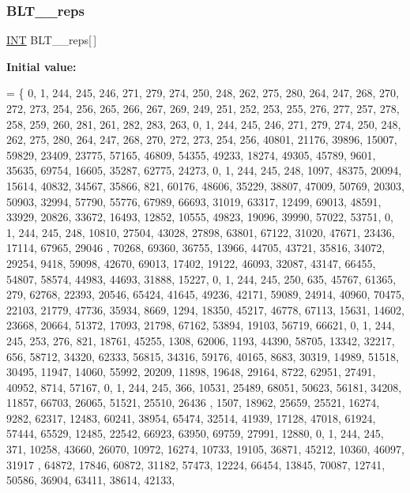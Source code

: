 \subsubsection{\texorpdfstring{B\+L\+T\+\_\+\_\+reps}{BLT\_41\_reps}}
{\footnotesize\ttfamily \mbox{\hyperlink{galois_8h_a09fddde158a3a20bd2dcadb609de11dc}{I\+NT}} B\+L\+T\+\_\+\_\+reps\mbox{[}$\,$\mbox{]}}

{\bfseries Initial value\+:}
\begin{DoxyCode}
= \{
    0, 1, 244, 245, 246, 271, 279, 274, 250, 248, 262, 275, 280, 264, 247, 268, 270, 272, 273, 254, 256, 
      265, 266, 267, 269, 249, 251, 252, 253, 255, 276, 277, 257, 278, 258, 259, 260, 281, 261, 282, 283, 263, 
    0, 1, 244, 245, 246, 271, 279, 274, 250, 248, 262, 275, 280, 264, 247, 268, 270, 272, 273, 254, 256, 
      40801, 21176, 39896, 15007, 59829, 23409, 23775, 57165, 46809, 54355, 49233, 18274, 49305, 45789, 9601, 35635,
       69754, 16605, 35287, 62775, 24273, 
    0, 1, 244, 245, 248, 1097, 48375, 20094, 15614, 40832, 34567, 35866, 821, 60176, 48606, 35229, 38807, 
      47009, 50769, 20303, 50903, 32994, 57790, 55776, 67989, 66693, 31019, 63317, 12499, 69013, 48591, 33929, 
      20826, 33672, 16493, 12852, 10555, 49823, 19096, 39990, 57022, 53751, 
    0, 1, 244, 245, 248, 10810, 27504, 43028, 27898, 63801, 67122, 31020, 47671, 23436, 17114, 67965, 29046
      , 70268, 69360, 36755, 13966, 44705, 43721, 35816, 34072, 29254, 9418, 59098, 42670, 69013, 17402, 19122, 
      46093, 32087, 43147, 66455, 54807, 58574, 44983, 44693, 31888, 15227, 
    0, 1, 244, 245, 250, 635, 45767, 61365, 279, 62768, 22393, 20546, 65424, 41645, 49236, 42171, 59089, 
      24914, 40960, 70475, 22103, 21779, 47736, 35934, 8669, 1294, 18350, 45217, 46778, 67113, 15631, 14602, 23668, 
      20664, 51372, 17093, 21798, 67162, 53894, 19103, 56719, 66621, 
    0, 1, 244, 245, 253, 276, 821, 18761, 45255, 1308, 62006, 1193, 44390, 58705, 13342, 32217, 656, 58712,
       34320, 62333, 56815, 34316, 59176, 40165, 8683, 30319, 14989, 51518, 30495, 11947, 14060, 55992, 20209, 
      11898, 19648, 29164, 8722, 62951, 27491, 40952, 8714, 57167, 
    0, 1, 244, 245, 366, 10531, 25489, 68051, 50623, 56181, 34208, 11857, 66703, 26065, 51521, 25510, 26436
      , 1507, 18962, 25659, 25521, 16274, 9282, 62317, 12483, 60241, 38954, 65474, 32514, 41939, 17128, 47018, 
      61924, 57444, 65529, 12485, 22542, 66923, 63950, 69759, 27991, 12880, 
    0, 1, 244, 245, 371, 10258, 43660, 26070, 10972, 16274, 10733, 19105, 36871, 45212, 10360, 46097, 31917
      , 64872, 17846, 60872, 31182, 57473, 12224, 66454, 13845, 70087, 12741, 50586, 36904, 63411, 38614, 42133, 

\end{DoxyCode}
